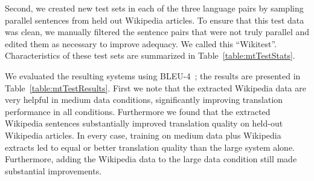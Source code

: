 Second, we created new test sets in each of the three language
pairs by sampling parallel sentences from held out Wikipedia
articles.  To ensure that this test data was clean, we manually
filtered the sentence pairs that were not truly parallel and
edited them as necessary to improve adequacy.  We called
this ``Wikitest''. Characteristics of
these test sets are summarized in Table~\ref{table:mtTestStats}.

We evaluated the resulting systems using
BLEU-4~\citep{Papineni02}; the results are presented in
Table~\ref{table:mtTestResults}.  First we note that the extracted
Wikipedia data are very helpful in medium data conditions,
significantly improving translation performance in all conditions.
Furthermore we found that the extracted Wikipedia sentences
substantially improved translation quality on held-out Wikipedia
articles. In every case, training on medium data plus Wikipedia
extracts led to equal or better translation quality than the large
system alone. Furthermore, adding the Wikipedia data to the large
data condition still made substantial improvements.
